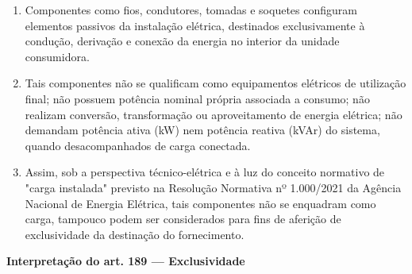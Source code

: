\begin{enumerate}[resume]
    \item Componentes como fios, condutores, tomadas e soquetes configuram elementos passivos da instalação elétrica, destinados exclusivamente à condução, derivação e conexão da energia no interior da unidade consumidora.

    \item Tais componentes não se qualificam como equipamentos elétricos de utilização final; não possuem potência nominal própria associada a consumo; não realizam conversão, transformação ou aproveitamento de energia elétrica; não demandam potência ativa (kW) nem potência reativa (kVAr) do sistema, quando desacompanhados de carga conectada.

    \item Assim, sob a perspectiva técnico-elétrica e à luz do conceito normativo de "carga instalada" previsto na Resolução Normativa nº 1.000/2021 da Agência Nacional de Energia Elétrica, tais componentes não se enquadram como carga, tampouco podem ser considerados para fins de aferição de exclusividade da destinação do fornecimento.
\end{enumerate}

\textbf{Interpretação do art. 189 --- Exclusividade}

